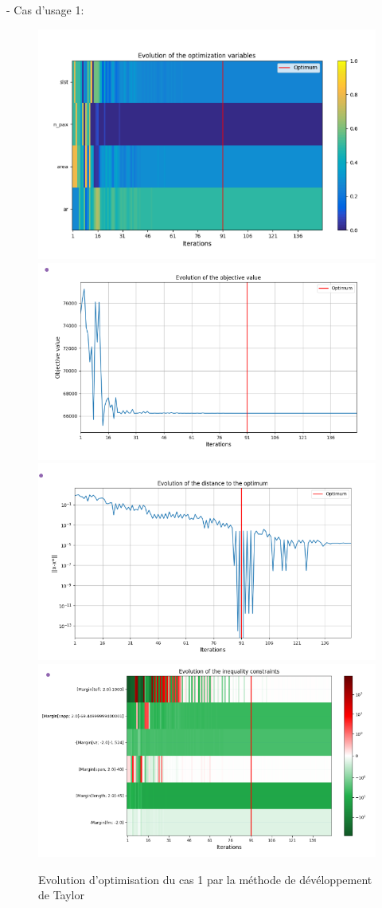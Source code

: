 \documentclass[a4paper, 11pt]{article}
\begin{document}
- Cas d'usage 1:  
\begin{figure}[H]
    \centering
    \includegraphics[width=0.45\linewidth]{Images_case_1/p3u1_taylor1.png}
    \includegraphics[width=0.45\linewidth]{Images_case_1/p3u1_taylor3.png}
    \includegraphics[width=0.45\linewidth]{Images_case_1/p3u1_taylor4.png}
    \includegraphics[width=0.45\linewidth]{Images_case_1/p3u1_taylor2.png}
    \caption{Evolution d'optimisation du cas 1 par la méthode de dévéloppement de Taylor}
    \label{fig:p3u2_taylor}
\end{figure}
\end{document}
